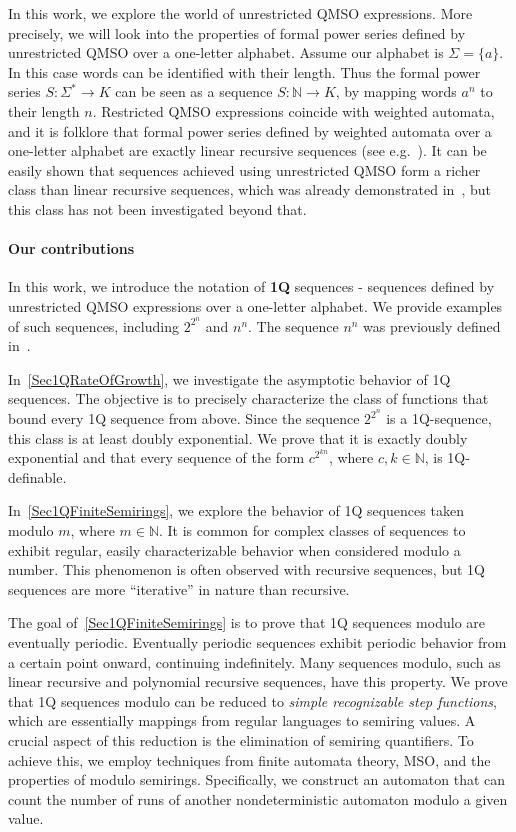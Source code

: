 \documentclass[12pt]{article}
\theoremstyle{definition}
\begin{document}
In this work, we explore the world of unrestricted QMSO expressions. More precisely, we will look into the properties of formal power series defined by unrestricted QMSO over a one-letter alphabet. Assume our alphabet is $\Sigma = \{a\}$. In this case words can be identified with their length. Thus the formal power series $S: \Sigma^* \rightarrow K$ can be seen as a sequence $S: \mathbb{N} \rightarrow K$, by mapping words $a^n$ to their length $n$. Restricted QMSO expressions coincide with weighted automata, and it is folklore that formal power series defined by weighted automata over a one-letter alphabet are exactly linear recursive sequences (see e.g.~\cite{BarloyFLM22}). It can be easily shown that sequences achieved using unrestricted QMSO form a richer class than linear recursive sequences, which was already demonstrated in~\cite{CadilhacMPPS20}, but this class has not been investigated beyond that.

\paragraph*{Our contributions}
In this work, we introduce the notation of \textbf{1Q} sequences - sequences defined by unrestricted QMSO expressions over a one-letter alphabet. We provide examples of such sequences, including $2^{2^n}$ and $n^n$. The sequence $n^n$ was previously defined in~\cite{CadilhacMPPS20}.

In~\cref{Sec1QRateOfGrowth}, we investigate the asymptotic behavior of 1Q sequences. The objective is to precisely characterize the class of functions that bound every 1Q sequence from above. Since the sequence $2^{2^n}$ is a 1Q-sequence, this class is at least doubly exponential. We prove that it is exactly doubly exponential and that every sequence of the form $c^{2^{kn}}$, where $c, k \in \mathbb{N}$, is 1Q-definable.

In~\cref{Sec1QFiniteSemirings}, we explore the behavior of 1Q sequences taken modulo $m$, where $m \in \mathbb{N}$. It is common for complex classes of sequences to exhibit regular, easily characterizable behavior when considered modulo a number. This phenomenon is often observed with recursive sequences, but 1Q sequences are more ``iterative'' in nature than recursive.

The goal of~\cref{Sec1QFiniteSemirings} is to prove that 1Q sequences modulo are eventually periodic. Eventually periodic sequences exhibit periodic behavior from a certain point onward, continuing indefinitely. Many sequences modulo, such as linear recursive and polynomial recursive sequences, have this property. We prove that 1Q sequences modulo can be reduced to \emph{simple recognizable step functions}, which are essentially mappings from regular languages to semiring values. A crucial aspect of this reduction is the elimination of semiring quantifiers. To achieve this, we employ techniques from finite automata theory, MSO, and the properties of modulo semirings. Specifically, we construct an automaton that can count the number of runs of another nondeterministic automaton modulo a given value.
\end{document}
